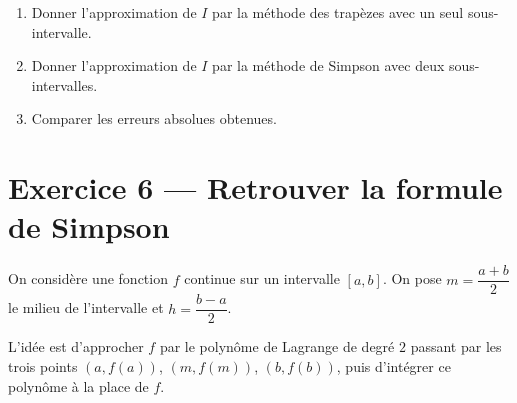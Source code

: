 \begin{enumerate}
\item Donner l'approximation de $I$ par la méthode des trapèzes
      avec un seul sous-intervalle.

\item Donner l'approximation de $I$ par la méthode de Simpson
      avec deux sous-intervalles.

\item Comparer les erreurs absolues obtenues.

\end{enumerate}

\section*{Exercice 6 --- Retrouver la formule de Simpson}

On considère une fonction $f$ continue sur un intervalle $[a,b]$.
On pose $m = \dfrac{a+b}{2}$ le milieu de l'intervalle
et $h = \dfrac{b-a}{2}$.

L'idée est d'approcher $f$ par le polynôme de Lagrange de degré $2$
passant par les trois points $(a, f(a))$, $(m, f(m))$, $(b, f(b))$,
puis d'intégrer ce polynôme à la place de $f$.

